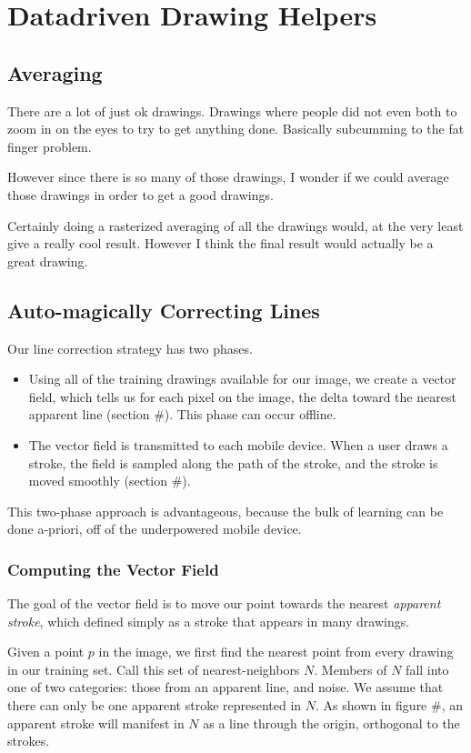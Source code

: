 \section{Datadriven Drawing Helpers}

\subsection{Averaging}
There are a lot of just ok drawings. Drawings where people did not even both to zoom in on the eyes to try to get anything done. Basically subcumming to the fat finger problem.

However since there is so many of those drawings, I wonder if we could average those drawings in order to get a good drawings.

Certainly doing a rasterized averaging of all the drawings would, at the very least give a really cool result. However I think the final result would actually be a great drawing.


\subsection{Auto-magically Correcting Lines}
Our line correction strategy has two phases.  
\begin{itemize}
\item Using all of the training drawings available for our image, we create a vector field, which tells us for each pixel on the image, the delta toward the nearest apparent line (section \#).  This phase can occur offline.
\item The vector field is transmitted to each mobile device.  When a user draws a stroke, the field is sampled along the path of the stroke, and the stroke is moved smoothly (section \#).  
\end{itemize}
This two-phase approach is advantageous, because the bulk of learning can be done a-priori, off of the underpowered mobile device.
\subsubsection{Computing the Vector Field}
The goal of the vector field is to move our point towards the nearest {\em apparent stroke}, which defined simply as a stroke that appears in many drawings.

Given a point $p$ in the image, we first find the nearest point from every drawing in our training set.  Call this set of nearest-neighbors $N$.  Members of $N$ fall into one of two categories: those from an apparent line, and noise.  We assume that there can only be one apparent stroke represented in $N$.  As shown in figure \#, an apparent stroke will manifest in $N$ as a line through the origin, orthogonal to the strokes.  



